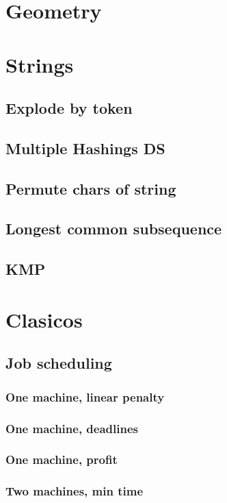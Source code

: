 \section{Geometry}


\section{Strings}
\subsection{Explode by token}
\subsection{Multiple Hashings DS}
\subsection{Permute chars of string}
\subsection{Longest common subsequence}
\subsection{KMP}
\section{Clasicos}
\subsection{Job scheduling}
\subsubsection{One machine, linear penalty}
\subsubsection{One machine, deadlines}
\subsubsection{One machine, profit}
\subsubsection{Two machines, min time}

